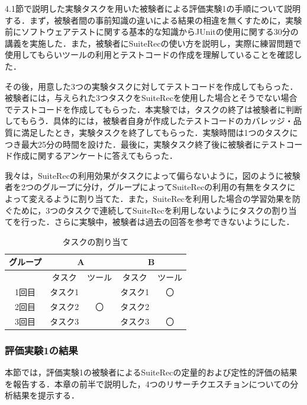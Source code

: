 \documentclass[12pt]{jarticle} %
\begin{document}
4.1節で説明した実験タスクを用いた被験者による評価実験1の手順について説明する．まず，被験者間の事前知識の違いによる結果の相違を無くすために，実験前にソフトウェアテストに関する基本的な知識からJUnitの使用に関する30分の講義を実施した．また，被験者に{\sf SuiteRec}の使い方を説明し，実際に練習問題で使用してもらいツールの利用とテストコードの作成を理解していることを確認した．

その後，用意した3つの実験タスクに対してテストコードを作成してもらった．被験者には，与えられた3つタスクを{\sf SuiteRec}を使用した場合とそうでない場合でテストコードを作成してもらった．本実験では，タスクの終了は被験者に判断してもらう．具体的には，被験者自身が作成したテストコードのカバレッジ・品質に満足したとき，実験タスクを終了してもらった．実験時間は1つのタスクにつき最大25分の時間を設けた．最後に，実験タスク終了後に被験者にテストコード作成に関するアンケートに答えてもらった．

我々は，SuiteRecの利用効果がタスクによって偏らないように，図のように被験者を2つのグループに分け，グループによってSuiteRecの利用の有無をタスクによって変えるように割り当てた．また，SuiteRecを利用した場合の学習効果を防ぐために，3つのタスクで連続してSuiteRecを利用しないようにタスクの割り当てを行った．さらに実験中，被験者は過去の回答を参考できないようにした．


\begin{table}[]
\caption{タスクの割り当て}
\begin{center}
\begin{tabular}{|c|l|l|l|c|}
\hline
グループ & \multicolumn{2}{c|}{A}                              & \multicolumn{2}{c|}{B}                           \\ \hline
     & \multicolumn{1}{c|}{タスク} & \multicolumn{1}{c|}{ツール} & \multicolumn{1}{c|}{タスク} & ツール                   \\ \hline
1回目  & タスク1                     &                          & タスク1                     & 〇                     \\ \hline
2回目  & タスク2                     & \multicolumn{1}{c|}{〇}   & タスク2                     & \multicolumn{1}{l|}{} \\ \hline
3回目  & タスク3                     &                          & タスク3                     & 〇                     \\ \hline
\end{tabular}
\end{center}
\end{table}

\subsubsection{評価実験1の結果}
本節では，評価実験1の被験者によるSuiteRecの定量的および定性的評価の結果を報告する．本章の前半で説明した，4つのリサーチクエスチョンについての分析結果を提示する．
\end{document}
